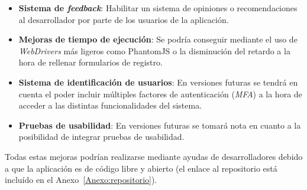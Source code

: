 \begin{itemize}
	\item \textbf{Sistema de \textit{feedback}}: Habilitar un sistema de opiniones o recomendaciones al desarrollador por parte de los usuarios de la aplicación.	
	\item \textbf{Mejoras de tiempo de ejecución}: Se podría conseguir mediante el uso de \textit{WebDrivers} más ligeros como PhantomJS o la disminución del retardo a la hora de rellenar formularios de registro.	
	\item \textbf{Sistema de identificación de usuarios}: En versiones futuras se tendrá en cuenta el poder incluir múltiples factores de autenticación (\textit{MFA}) a la hora de acceder a las distintas funcionalidades del sistema.	
        \item \textbf{Pruebas de usabilidad}: En versiones futuras se tomará nota en cuanto a la posibilidad de integrar pruebas de usabilidad.	

\end{itemize}


Todas estas mejoras podrían realizarse mediante ayudas de desarrolladores debido a que la aplicación es de código libre y abierto (el enlace al repositorio está incluído en el Anexo~\ref{Anexo:repositorio}).

\newpage \thispagestyle{empty} %